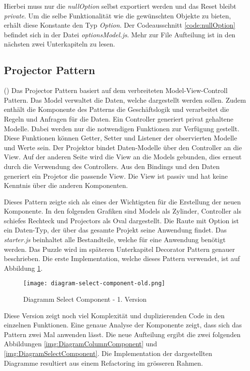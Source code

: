Hierbei muss nur die \emph{nullOption} selbst exportiert werden und das Reset bleibt \emph{private}.
Um die selbe Funktionalität wie die gewünschten Objekte zu bieten, erhält diese Konstante den Typ \emph{Option}.
Der Codeausschnitt \ref{code:nullOption} befindet sich in der Datei \emph{optionsModel.js}.
Mehr zur File Aufteilung ist in den nächsten zwei Unterkapiteln zu lesen.

\subsection{Projector Pattern}
\label{sec:projectorPattern}

(\cite{projectorPattern}) Das Projector Pattern basiert auf dem verbreiteten Model-View-Controll Pattern.
Das Model verwaltet die Daten, welche dargestellt werden sollen.
Zudem enthält die Komponente des Patterns die Geschäftslogik und verarbeitet die Regeln und Anfragen für die Daten.
Ein Controller generiert privat gehaltene Modelle.
Dabei werden nur die notwendigen Funktionen zur Verfügung gestellt.
Diese Funktionen können Getter, Setter und Listener der observierten Modelle und Werte sein.
Der Projektor bindet Daten-Modelle über den Controller an die View.
Auf der anderen Seite wird die View an die Models gebunden, dies erneut durch die Verwendung des Controllers.
Aus den Bindings und den Daten generiert ein Projetor die passende View.
Die View ist passiv und hat keine Kenntnis über die anderen Komponenten.

Dieses Pattern zeigte sich als eines der Wichtigsten für die Erstellung der neuen Komponente.
In den folgenden Grafiken sind Models als Zylinder, Controller als schiefes Rechteck und Projectors als Oval dargestellt.
Die Raute mit Option ist ein Daten-Typ, der über das gesamte Projekt seine Anwendung findet.
Das \emph{starter.js} beinhaltet alle Bestandteile, welche für eine Anwendung benötigt werden.
Das Puzzle wird im späteren Unterkapitel Decorator Pattern genauer beschrieben.
Die erste Implementation, welche dieses Pattern verwendet, ist auf Abbildung \ref{img:DiagramSelectComponentOld}.

\begin{figure}[!htb]
    \centering
    \texttt{[image: diagram-select-component-old.png]}
    \caption{Diagramm Select Component - 1. Version}
    \label{img:DiagramSelectComponentOld}
\end{figure}

Diese Version zeigt noch viel Komplexität und duplizierenden Code in den einzelnen Funktionen.
Eine genaue Analyse der Komponente zeigt, dass sich das Pattern zwei Mal anwenden lässt.
Die neue Aufteilung ergibt die zwei folgenden Abbildungen \ref{img:DiagramColumnComponent} und \ref{img:DiagramSelectComponent}.
Die Implementation der dargestellten Diagramme resultiert aus einem Refactoring im grösseren Rahmen.


